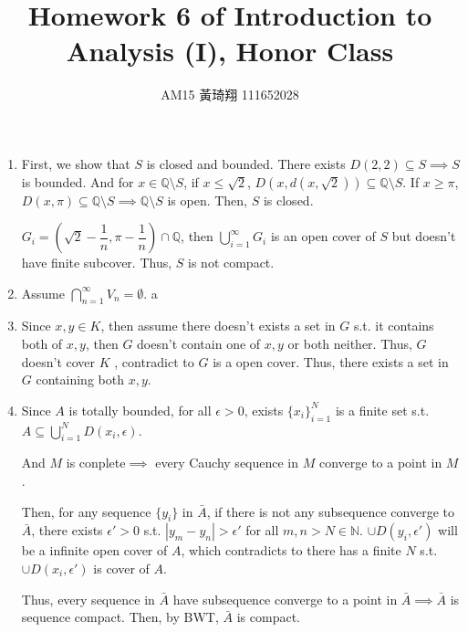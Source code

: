 \documentclass[12pt]{article}
\title{Homework 6 of Introduction to Analysis (I), Honor Class}
\author{AM15 黃琦翔 111652028}
\begin{document}
\maketitle
\begin{enumerate}
    \item First, we show that $S$ is closed and bounded. There exists $D(2, 2) \subseteq S\implies S$ is bounded.
    And for $x\in \mathbb{Q}\setminus S$, if $x\leq \sqrt{2}$, $D(x, d(x, \sqrt{2}))\subseteq \mathbb{Q}\setminus S$. If $x\geq \pi$, $D(x, \pi) \subseteq \mathbb{Q}\setminus S\implies \mathbb{Q}\setminus S$ is open.
    Then, $S$ is closed.

    $G_i = (\sqrt{2} - \dfrac{1}{n}, \pi - \dfrac{1}{n}) \cap \mathbb{Q}$, then $\displaystyle\bigcup_{i=1}^{\infty} G_i$ is an open cover of $S$ but doesn't have finite subcover.
    Thus, $S$ is not compact.

    \item Assume $\displaystyle\bigcap_{n=1}^{\infty} V_n = \emptyset$.
    a

    
    \item Since $x, y\in K$, then assume there doesn't exists a set in $G$ s.t. it contains both of $x, y$, then $G$ doesn't contain one of $x, y$ or both neither.
    Thus, $G$ doesn't cover $K$ , contradict to $G$ is a open cover. Thus, there exists a set in $G$ containing both $x, y$.

    \item Since $A$ is totally bounded, for all $\epsilon > 0$, exists $\lbrace x_i\rbrace_{i=1}^N$ is a finite set s.t. $A \subseteq \displaystyle\bigcup_{i=1}^N D(x_i, \epsilon)$.
    
    And $M$ is conplete$\implies$ every Cauchy sequence in $M$ converge to a point in $M$.

    Then, for any sequence $\lbrace y_i\rbrace$ in $\bar{A}$, if there is not any subsequence converge to $\bar{A}$, there exists $\epsilon' > 0$ s.t. $|y_m-y_n| > \epsilon'$ for all $m, n > N\in \mathbb{N}$.
    $\cup D(y_i, \epsilon')$ will be a infinite open cover of $A$, which contradicts to there has a finite $N$ s.t. $\cup D(x_i, \epsilon')$ is cover of $A$.

    Thus, every sequence in $\bar{A}$ have subsequence converge to a point in $\bar{A}\implies \bar{A}$ is sequence compact.
    Then, by BWT, $\bar{A}$ is compact.
\end{enumerate}
\end{document}
